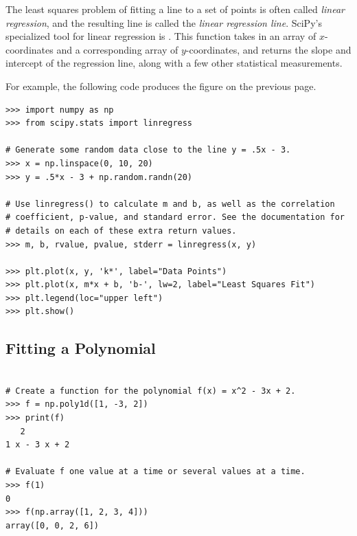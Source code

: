 \begin{info} %
The least squares problem of fitting a line to a set of points is often called \emph{linear regression}, and the resulting line is called the \emph{linear regression line}.
SciPy's specialized tool for linear regression is .
This function takes in an array of $x$-coordinates and a corresponding array of $y$-coordinates, and returns the slope and intercept of the regression line, along with a few other statistical measurements.

For example, the following code produces the figure on the previous page.

\begin{lstlisting}
>>> import numpy as np
>>> from scipy.stats import linregress

# Generate some random data close to the line y = .5x - 3.
>>> x = np.linspace(0, 10, 20)
>>> y = .5*x - 3 + np.random.randn(20)

# Use linregress() to calculate m and b, as well as the correlation
# coefficient, p-value, and standard error. See the documentation for
# details on each of these extra return values.
>>> m, b, rvalue, pvalue, stderr = linregress(x, y)

>>> plt.plot(x, y, 'k*', label="Data Points")
>>> plt.plot(x, m*x + b, 'b-', lw=2, label="Least Squares Fit")
>>> plt.legend(loc="upper left")
>>> plt.show()
\end{lstlisting}
\end{info}

\subsection*{Fitting a Polynomial} %


\begin{lstlisting}

# Create a function for the polynomial f(x) = x^2 - 3x + 2.
>>> f = np.poly1d([1, -3, 2])
>>> print(f)
   2
1 x - 3 x + 2

# Evaluate f one value at a time or several values at a time.
>>> f(1)
0
>>> f(np.array([1, 2, 3, 4]))
array([0, 0, 2, 6])

\end{lstlisting}


